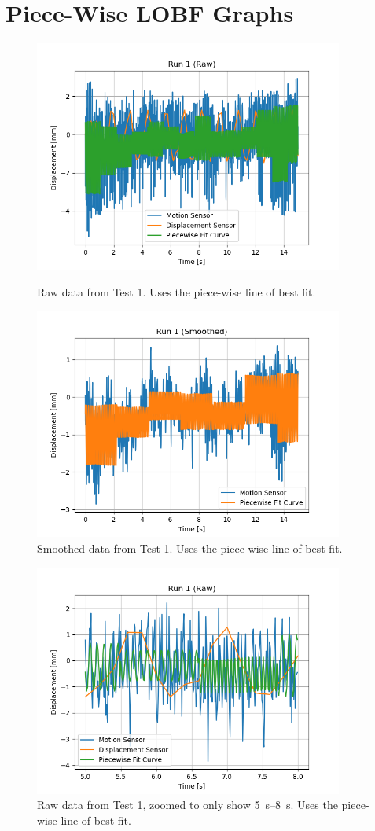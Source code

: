\documentclass[12 pt]{report}
\begin{document}
\newpage
\section{Piece-Wise LOBF Graphs} \label{piece-wise_lobf_graphs}


\begin{figure}[htbp]
\centering
\includegraphics[width=4in]{images/Graphs/Run_1-Raw-PW}
\caption{Raw data from Test \num{1}. Uses the piece-wise line of best fit.}

\centering
\includegraphics[width=4in]{images/Graphs/Run_1-Smoothed-PW}
\caption{Smoothed data from Test \num{1}. Uses the piece-wise line of best fit.}
\end{figure}

\begin{figure}[htbp]
\centering
\includegraphics[width=4in]{images/Graphs/Run_1-Raw-PW-Zoomed}
\caption{Raw data from Test \num{1}, zoomed to only show \qtyrange{5}{8}{\s}. Uses the piece-wise line of best fit.}
\end{figure}
\end{document}

